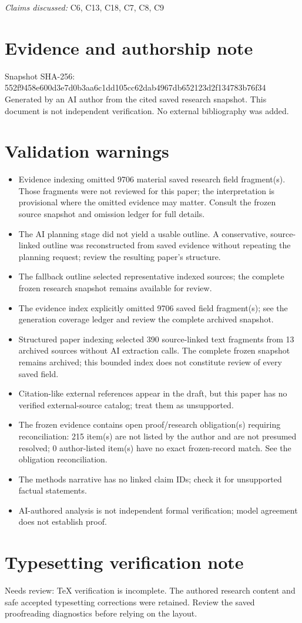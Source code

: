 \documentclass[11pt]{article}
\begin{document}
\textit{Claims discussed: }C6, C13, C18, C7, C8, C9
\section*{Evidence and authorship note}
Snapshot SHA-256: 552f9458e600d3e7d0b3aa6c1dd105cc62dab4967db652123d2f134783b76f34
Generated by an AI author from the cited saved research snapshot. This document is not independent verification. No external bibliography was added.
\section*{Validation warnings}
\begin{itemize}
\item Evidence indexing omitted 9706 material saved research field fragment(s). Those fragments were not reviewed for this paper; the interpretation is provisional where the omitted evidence may matter. Consult the frozen source snapshot and omission ledger for full details.
\item The AI planning stage did not yield a usable outline. A conservative, source-linked outline was reconstructed from saved evidence without repeating the planning request; review the resulting paper's structure.
\item The fallback outline selected representative indexed sources; the complete frozen research snapshot remains available for review.
\item The evidence index explicitly omitted 9706 saved field fragment(s); see the generation coverage ledger and review the complete archived snapshot.
\item Structured paper indexing selected 390 source-linked text fragments from 13 archived sources without AI extraction calls. The complete frozen snapshot remains archived; this bounded index does not constitute review of every saved field.
\item Citation-like external references appear in the draft, but this paper has no verified external-source catalog; treat them as unsupported.
\item The frozen evidence contains open proof/research obligation(s) requiring reconciliation: 215 item(s) are not listed by the author and are not presumed resolved; 0 author-listed item(s) have no exact frozen-record match. See the obligation reconciliation.
\item The methods narrative has no linked claim IDs; check it for unsupported factual statements.
\item AI-authored analysis is not independent formal verification; model agreement does not establish proof.
\end{itemize}
\section*{Typesetting verification note}
Needs review: TeX verification is incomplete. The authored research content and safe accepted typesetting corrections were retained. Review the saved proofreading diagnostics before relying on the layout.
\end{document}
